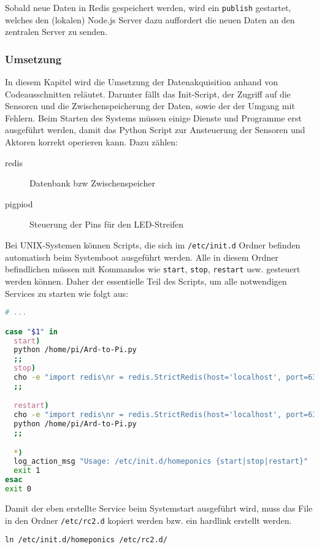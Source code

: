 Sobald neue Daten in Redis gespeichert werden, wird ein \texttt{publish} gestartet, welches den (lokalen) Node.js Server dazu auffordert die neuen Daten an den zentralen Server zu senden.

\newpage
\subsubsection{Umsetzung}
In diesem Kapitel wird die Umsetzung der Datenakquisition anhand von Codeausschnitten reläutet. Darunter fällt das Init-Script, der Zugriff auf die Sensoren und die Zwischenspeicherung der Daten, sowie der der Umgang mit Fehlern.
Beim Starten des Systems müssen einige Dienste und Programme erst ausgeführt werden, damit das Python Script zur Ansteuerung der Sensoren und Aktoren korrekt operieren kann. Dazu zählen:
\begin{description}
    \item [redis] Datenbank bzw Zwischenspeicher
    \item [pigpiod] Steuerung der Pins für den LED-Streifen
\end{description}
Bei UNIX-Systemen können Scripts, die sich im \texttt{/etc/init.d} Ordner befinden automatisch beim Systemboot ausgeführt werden. Alle in diesem Ordner befindlichen müssen mit Kommandos wie \texttt{start}, \texttt{stop}, \texttt{restart} usw. gesteuert werden können. Daher der essentielle Teil des Scripts, um alle notwendigen Services zu starten wie folgt aus:
\begin{lstlisting}[language=bash]
# ...

case "$1" in
  start)
  python /home/pi/Ard-to-Pi.py
  ;;
  stop)
  cho -e "import redis\nr = redis.StrictRedis(host='localhost', port=6379, db=0)\nr.publish('system', 'exit')" | python
  ;;

  restart)
  cho -e "import redis\nr = redis.StrictRedis(host='localhost', port=6379, db=0)\nr.publish('system', 'exit')" | python
  python /home/pi/Ard-to-Pi.py
  ;;

  *)
  log_action_msg "Usage: /etc/init.d/homeponics {start|stop|restart}" || true
  exit 1
esac
exit 0
\end{lstlisting}
Damit der eben erstellte Service beim Systemstart ausgeführt wird, muss das File in den Ordner \texttt{/etc/rc2.d} kopiert werden bzw. ein hardlink erstellt werden.
\begin{center}
\texttt{ln /etc/init.d/homeponics /etc/rc2.d/}
\end{center}

